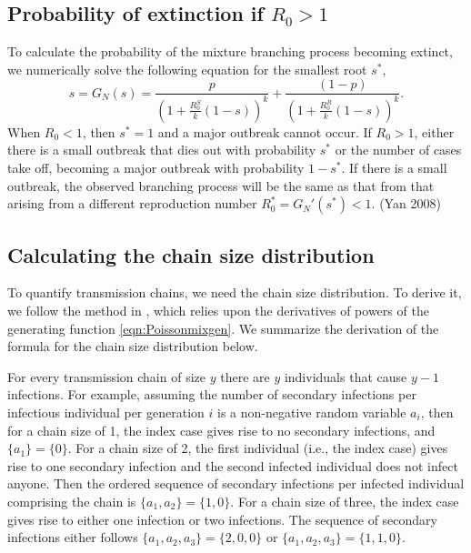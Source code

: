 \documentclass{imammb}
\numberwithin{equation}{section}
\begin{document}
\subsection{Probability of extinction if $R_0>1$}
To calculate the probability of the mixture branching process becoming extinct, we numerically solve the following equation for the smallest root $s^*$, 
\begin{equation}
      s = G_N(s) =  \frac{p}{(1 + \frac{R_0^S}{k}(1-s))^k} +   \frac{(1-p)}{(1 + \frac{R_0^R}{k}(1-s))^k}. 
\end{equation}
When $R_0<1$, then $s^* = 1$ and a major outbreak cannot occur. If $R_0>1$, either there is a small outbreak that dies out with probability $s^*$ or the number of cases take off, becoming a major outbreak with probability $1-s^*$. If there is a small outbreak, the observed branching process will be the same as that from that arising from a different reproduction number $R_0^* = G_N'(s^*)<1$. (Yan 2008) %




\subsection{Calculating the chain size distribution}



To quantify transmission chains, we need the chain size distribution. To derive it, we follow the method in \citet{Blumberg2013-xv}, which relies upon the derivatives of powers of the generating function \eqref{eqn:Poissonmixgen}. We summarize the derivation of the formula for the chain size distribution below. 

For every transmission chain of size $y$ there are $y$ individuals that cause $y-1$ infections. For example, assuming the number of secondary infections per infectious individual per generation $i$ is a non-negative random variable $a_i$, then for a chain size of 1, the index case gives rise to no secondary infections, and $\{a_1\} = \{ 0\}$. For a chain size of 2, the first individual (i.e., the index case) gives rise to one secondary infection and the second infected individual does not infect anyone. Then the ordered sequence of secondary infections per infected individual comprising the chain is $\{a_1, a_2\} = \{1, 0\}$. For a chain size of three, the index case gives rise to either one infection or two infections. The sequence of secondary infections either follows $\{a_1, a_2, a_3\} = \{2, 0, 0\}$ or $\{a_1, a_2, a_3\} = \{1, 1, 0\}$. %
\end{document}

